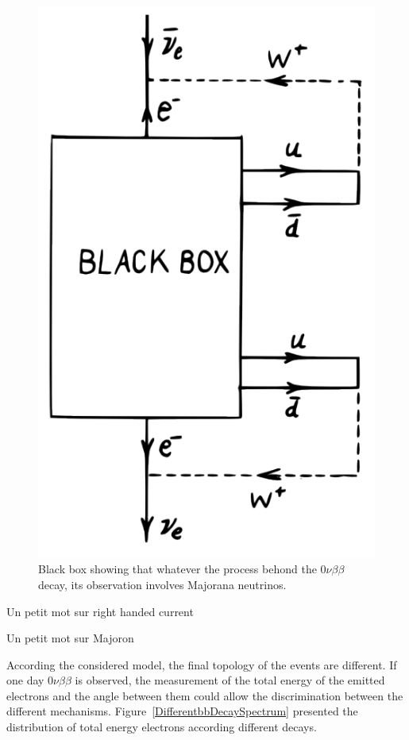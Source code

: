 \documentclass[main.tex]{subfiles}
\begin{document}
\begin{figure}[h!]
\begin{center}
\includegraphics[scale=0.30]{pictures/Chap2/blackBox.png}
\caption{Black box showing that whatever the process behond the 0$\nu\beta\beta$ decay, its observation involves Majorana neutrinos.}
\label{blackBox}
\end{center}
\end{figure}


\FloatBarrier


\NI Un petit mot sur right handed current


\bigskip


\NI Un petit mot sur Majoron


\bigskip


\NI According the considered model, the final topology of the events are different. If one day 0$\nu\beta\beta$ is observed, the measurement of the total energy of the emitted electrons and the angle between them could allow the discrimination between the different mechanisms. Figure~\ref{DifferentbbDecaySpectrum} presented the distribution of total energy electrons according different decays.
\end{document}
